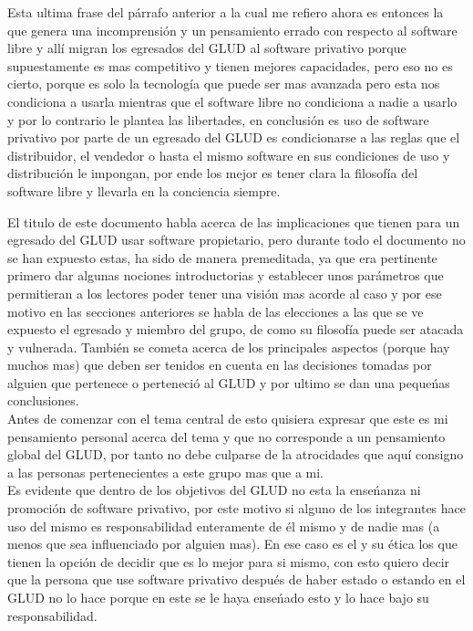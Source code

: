 \begin{multicols}{2}
Esta ultima frase del párrafo anterior a la cual me refiero ahora es entonces la que genera una incomprensión y un pensamiento errado con 
respecto al software libre y allí migran los egresados del GLUD al software privativo porque supuestamente es mas competitivo y tienen 
mejores capacidades, pero eso no es cierto, porque es solo la tecnología que puede ser mas avanzada pero esta nos condiciona a usarla mientras 
que el software libre no condiciona a nadie a usarlo y por lo contrario le plantea las libertades, en conclusión es uso de software privativo 
por parte de un egresado del GLUD es condicionarse a las reglas que el distribuidor, el vendedor o hasta el mismo software en sus condiciones 
de uso y distribución le impongan, por ende los mejor es tener clara la filosofía del software libre y llevarla en la conciencia siempre.



El titulo de este documento habla acerca de las implicaciones que tienen para un egresado del GLUD usar software propietario, pero durante todo 
el documento no se han expuesto estas, ha sido de manera premeditada, ya que era pertinente primero dar algunas nociones introductorias y establecer
unos parámetros que permitieran a los lectores poder tener una visión mas acorde al caso y por ese motivo en las secciones anteriores se habla 
de las elecciones a las que se ve expuesto el egresado y miembro del grupo, de como su filosofía puede ser atacada y vulnerada. También se cometa 
acerca de los principales aspectos (porque hay muchos mas) que deben ser tenidos en cuenta en las decisiones tomadas por alguien que pertenece o 
perteneció al GLUD y por ultimo se dan una pequeńas conclusiones.\\

Antes de comenzar con el tema central de esto quisiera expresar que este es mi pensamiento personal acerca del tema y que no corresponde a un 
pensamiento global del GLUD, por tanto no debe culparse de la atrocidades que aquí consigno a las personas pertenecientes a este grupo mas que a mi.\\
Es evidente que dentro de los objetivos del GLUD no esta la enseńanza ni promoción de software privativo, por este motivo si alguno de los integrantes 
hace uso del mismo es responsabilidad enteramente de él mismo y de nadie mas (a menos que sea influenciado por alguien mas). En ese caso es el y 
su ética los que tienen la opción de decidir que es lo mejor para si mismo, con esto quiero decir que la persona que use software privativo 
después de haber estado o estando en el GLUD no lo hace porque en este se le haya enseńado esto y lo hace bajo su responsabilidad.\\


\end{multicols}
